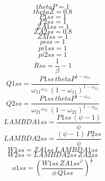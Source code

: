 \begin{dmath*}
thetaP = 1
\end{dmath*}
\begin{dmath*}
thetaZ = 0.8
\end{dmath*}
\begin{dmath*}
P1ss = 1
\end{dmath*}
\begin{dmath*}
P2ss = 1
\end{dmath*}
\begin{dmath*}
ZA1ss = 1
\end{dmath*}
\begin{dmath*}
ZA2ss = 0.8
\end{dmath*}
\begin{dmath*}
ZMss = 1
\end{dmath*}
\begin{dmath*}
piss = 1
\end{dmath*}
\begin{dmath*}
pi1ss = 1
\end{dmath*}
\begin{dmath*}
pi2ss = 1
\end{dmath*}
\begin{dmath*}
Rss = \frac{1}{{{\beta}}}-1
\end{dmath*}
\begin{dmath*}
Q1ss = \frac{{P1ss}\, {thetaP}^{1-{{\omega_{11}}}}}{{{\omega_{11}}}^{{{\omega_{11}}}}\, \left(1-{{\omega_{11}}}\right)^{1-{{\omega_{11}}}}}
\end{dmath*}
\begin{dmath*}
Q2ss = \frac{{P1ss}\, {thetaP}^{1-{{\omega_{11}}}}}{{{\omega_{21}}}^{{{\omega_{21}}}}\, \left(1-{{\omega_{21}}}\right)^{1-{{\omega_{21}}}}}
\end{dmath*}
\begin{dmath*}
LAMBDA1ss = \frac{{P1ss}\, \left({{\psi}}-1\right)}{{{\psi}}}
\end{dmath*}
\begin{dmath*}
LAMBDA2ss = \frac{\left({{\psi}}-1\right)\, {P2ss}}{{{\psi}}}
\end{dmath*}
\begin{dmath*}
W1ss = {ZA1ss}\, {LAMBDA1ss}
\end{dmath*}
\begin{dmath*}
W2ss = {LAMBDA2ss}\, {ZA2ss}
\end{dmath*}
\begin{dmath*}
a1ss = \left(\frac{{W1ss}\, {ZA1ss}^{{{\varphi}}}}{{{\phi}}\, {Q1ss}}\right)^{\frac{1}{{{\sigma}}}}
\end{dmath*}

